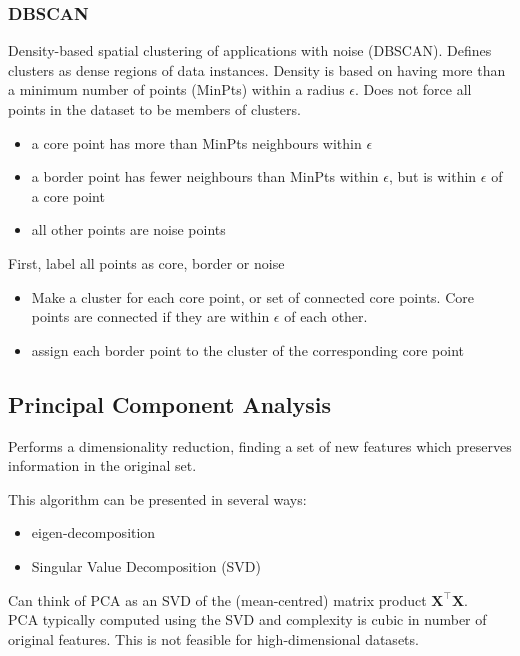 \subsubsection{DBSCAN}

Density-based spatial clustering of applications with noise (DBSCAN). Defines clusters as dense regions of data instances. Density is based on having more than a minimum number of points (MinPts) within a radius \(\epsilon\). Does not force all points in the dataset to be members of clusters.

\begin{itemize}
    \item a core point has more than MinPts neighbours within \(\epsilon\)
    \item a border point has fewer neighbours than MinPts within \(\epsilon\), but is within \(\epsilon\) of a core point
    \item all other points are noise points
\end{itemize}

First, label all points as core, border or noise
\begin{itemize}
    \item Make a cluster for each core point, or set of connected core points. Core points are connected if they are within \(\epsilon\) of each other.
    \item assign each border point to the cluster of the corresponding core point
\end{itemize}

\subsection{Principal Component Analysis}

Performs a dimensionality reduction, finding a set of new features which preserves information in the original set.

This algorithm can be presented in several ways:
\begin{itemize}
    \item eigen-decomposition
    \item Singular Value Decomposition (SVD)
\end{itemize}

Can think of PCA as an SVD of the (mean-centred) matrix product \(\mathbf{X}^\top \mathbf{X}\). \\

PCA typically computed using the SVD and complexity is cubic in number of original features. This is not feasible for high-dimensional datasets.